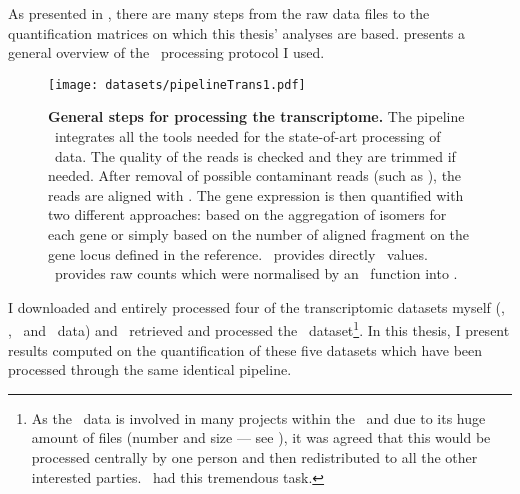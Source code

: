 As presented in , there are many steps from the raw data
files to the quantification matrices on which this thesis' analyses are based.
 presents a general overview of the \Rnaseq\ processing
protocol I used.

\begin{figure}
    \texttt{[image: datasets/pipelineTrans1.pdf]}\centering
    \caption[General steps for processing the transcriptomic
    data]{\label{fig:pipelineTrans}\textbf{General steps for processing the
    transcriptome.} The pipeline \irap\ integrates
    all the tools needed for the state-of-art
    processing of \Rnaseq\ data. The quality of the reads is checked and they
    are trimmed if needed. After removal of possible contaminant reads (such as
    ), the reads
    are aligned with \toph. The gene expression is then quantified with two
    different approaches: based on the aggregation of isomers for each gene or
    simply based on the number of aligned fragment on the gene locus defined in
    the reference. \cuffl\ provides directly \FPKM\ values. \htseq\ provides
    raw counts which were normalised by an \irap\ function into \FPKM.}
\end{figure}

I downloaded and entirely processed four of the transcriptomic datasets
myself (\castle, \vt, \ibm\ and \uhlen\ data) and
\nuno\ retrieved and processed the \gtex\ dataset\footnote{As
the \Gtex\ data is involved in many projects within the \EBI\
and due to its huge amount of files (number and  size --- see ),
it was agreed that this would be processed centrally by one person and then
redistributed to all the other interested parties. \nuno\ had this
tremendous task.}.
In this thesis,
I present results computed on the quantification of these
five datasets which have been processed through the same identical pipeline.

